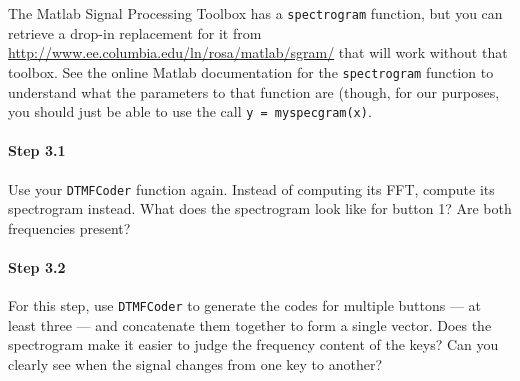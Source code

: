 The Matlab Signal Processing Toolbox has a \verb|spectrogram|
function, but you can retrieve a drop-in replacement for it from
\url{http://www.ee.columbia.edu/ln/rosa/matlab/sgram/} that will work
without that toolbox. See the online Matlab documentation for the
\verb|spectrogram| function to understand what the parameters to that
function are (though, for our purposes, you should just be able to use
the call \verb|y = myspecgram(x)|.

\paragraph{Step 3.1} Use your \verb|DTMFCoder| function again. Instead
of computing its FFT, compute its spectrogram instead. What does the
spectrogram look like for button 1? Are both frequencies present?


\paragraph{Step 3.2} For this step, use \verb|DTMFCoder| to generate
the codes for multiple buttons --- at least three --- and concatenate
them together to form a single vector. Does the spectrogram make it
easier to judge the frequency content of the keys? Can you clearly see
when the signal changes from one key to another?

